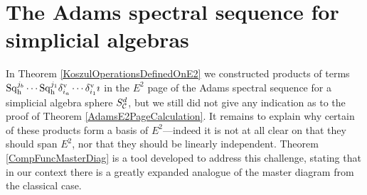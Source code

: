 \documentclass[11pt]{article}
\theoremstyle{plain}
\newcommand{\Sq}{\mathrm{Sq}}
\begin{document}
\section{The Adams spectral sequence for simplicial algebras}
In Theorem \ref{KoszulOperationsDefinedOnE2} we constructed products of terms $\Sq^{j_b}_\textup{h}\cdots \Sq^{j_1}_\textup{h}\delta_{i_a}^\textup{v}\cdots \delta_{i_1}^\textup{v}\imath$ in the $E^2$ page of the Adams spectral sequence for a simplicial algebra sphere $S^d_{\mathcal{C}}$, but we still did not give any indication as to the proof of Theorem \ref{AdamsE2PageCalculation}. It remains to explain why certain of these products form a basis of $E^2$---indeed it is not at all clear on that they should span $E^2$, nor that they should be linearly independent. Theorem \ref{CompFuncMasterDiag} is a tool developed to address this challenge, stating that in our context there is a greatly expanded analogue of the master diagram from the classical case. 
%
%
%
%
%
\end{document}

